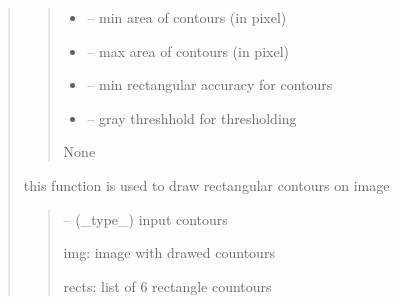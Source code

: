 \documentclass[letterpaper,10pt,english]{sphinxmanual}
\begin{document}
\begin{quote}
\begin{savenotes}
\begin{fulllineitems}
\begin{quote}
\begin{description}
\begin{itemize}
\item {} 
\sphinxAtStartPar
{} – min area of contours (in pixel)

\item {} 
\sphinxAtStartPar
{} – max area of contours (in pixel)

\item {} 
\sphinxAtStartPar
{} – min rectangular accuracy for contours

\item {} 
\sphinxAtStartPar
{} – gray threshhold for thresholding

\end{itemize}

\sphinxAtStartPar
None

\end{description}\end{quote}

\begin{savenotes}\begin{fulllineitems}
\label{\detokenize{setting/backend/pxvalue_calibration:oxin.backend.pxvalue_calibration.extract_info.draw_rects}}
\pysigstartsignatures
{}
\pysigstopsignatures
\sphinxAtStartPar
this function is used to draw rectangular contours on image
\begin{quote}\begin{description}
\sphinxAtStartPar
{} – (\_type\_) input contours

\sphinxAtStartPar
img: image with drawed countours

\sphinxAtStartPar
rects: list of 6 rectangle countours

\end{description}\end{quote}

\end{fulllineitems}\end{savenotes}



\end{fulllineitems}
\end{savenotes}
\end{quote}
\end{document}
